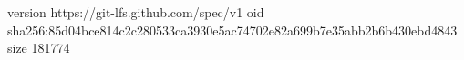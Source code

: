 version https://git-lfs.github.com/spec/v1
oid sha256:85d04bce814c2c280533ca3930e5ac74702e82a699b7e35abb2b6b430ebd4843
size 181774

